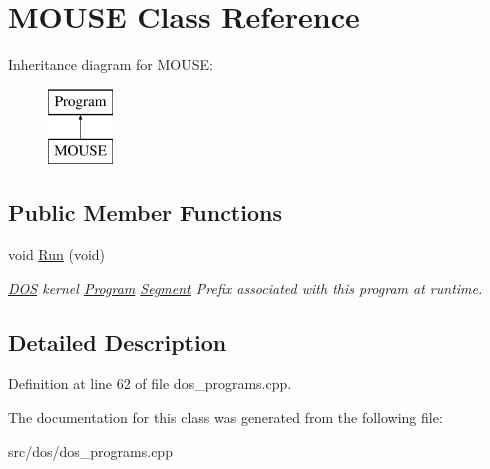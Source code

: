 \hypertarget{classMOUSE}{\section{M\-O\-U\-S\-E Class Reference}
\label{classMOUSE}
}
Inheritance diagram for M\-O\-U\-S\-E\-:\begin{figure}[H]
\begin{center}
\leavevmode
\includegraphics[height=2.000000cm]{classMOUSE}
\end{center}
\end{figure}
\subsection*{Public Member Functions}
\begin{DoxyCompactItemize}
\item 
\hypertarget{classMOUSE_a534674c1b95232e1fa0a0ec93bcbd698}{void \hyperlink{classMOUSE_a534674c1b95232e1fa0a0ec93bcbd698}{Run} (void)}\label{classMOUSE_a534674c1b95232e1fa0a0ec93bcbd698}

\begin{DoxyCompactList}\small\item\em \hyperlink{classDOS}{D\-O\-S} kernel \hyperlink{classProgram}{Program} \hyperlink{structSegment}{Segment} Prefix associated with this program at runtime. \end{DoxyCompactList}\end{DoxyCompactItemize}


\subsection{Detailed Description}


Definition at line 62 of file dos\-\_\-programs.\-cpp.



The documentation for this class was generated from the following file\-:\begin{DoxyCompactItemize}
\item 
src/dos/dos\-\_\-programs.\-cpp\end{DoxyCompactItemize}
